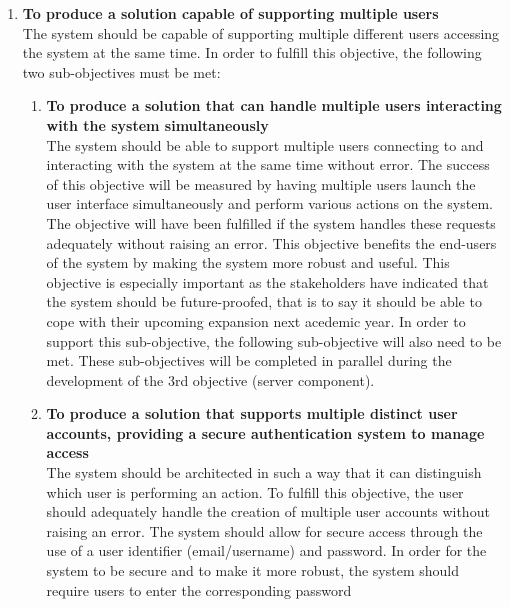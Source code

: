 \documentclass[../../../main.tex]{subfiles}
\begin{document}
\begin{enumerate}
      \item \textbf{To produce a solution capable of supporting multiple users}\\
            The system should be capable of supporting multiple different users accessing the system at the
            same time. In order to fulfill this objective, the following two sub-objectives must be met:
            \begin{enumerate}
                  \item \textbf{To produce a solution that can handle multiple users interacting with the system simultaneously}\\
                        The system should be able to support multiple users connecting to and interacting with the system at the
                        same time without error. The success of this objective will be measured by having multiple users launch
                        the user interface simultaneously and perform various actions on the system. The objective will have been
                        fulfilled if the system handles these requests adequately without raising an error.
                        This objective benefits the end-users of the system by making the system more robust and useful.
                        This objective is especially important as the stakeholders have indicated that the system should be future-proofed,
                        that is to say it should be able to cope with their upcoming expansion next acedemic year.
                        In order to support this sub-objective, the following sub-objective will also need to be met.
                        These sub-objectives will be completed in parallel during the development of the 3rd objective (server component).
                  \item \textbf{To produce a solution that supports multiple distinct user accounts, providing a secure authentication system to manage access}\\
                        The system should be architected in such a way that it can distinguish which user is
                        performing an action. To fulfill this objective, the user should adequately handle the creation
                        of multiple user accounts without raising an error. The system should allow for secure access
                        through the use of a user identifier (email/username) and password. In order for the system to be
                        secure and to make it more robust, the system should require users to enter the corresponding password

\end{enumerate}
\end{enumerate}
\end{document}
